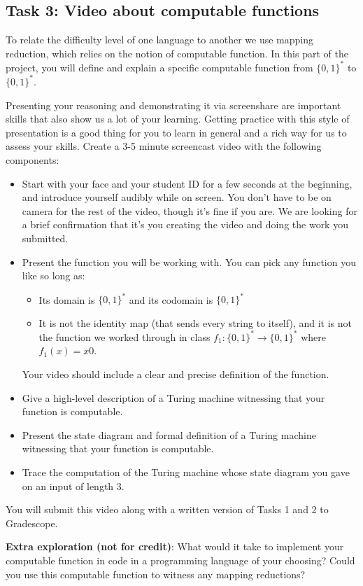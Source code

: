 \documentclass[12pt, oneside]{article}
\begin{document}
		
\subsection*{Task 3: Video about computable functions}
To relate the difficulty level of one language to another we use mapping reduction, which relies
on the notion of computable function. In this part of the project, you will define and explain a specific 
computable function from $\{0,1\}^*$ to $\{0,1\}^*$.

 Presenting your reasoning and demonstrating it via screenshare are important skills that 
 also show us a lot of your learning. Getting practice with this style of presentation is a 
 good thing for you to learn in general and a rich way for us to assess your skills. Create 
 a 3-5 minute screencast video with the following components:
 \begin{itemize}
	\item Start with your face and your student ID for a few seconds at the beginning, and introduce yourself audibly while on screen. 
	You don't have to be on camera for the rest of the video, though it's fine if you are. 
	We are looking for a brief confirmation that it's you creating the video and 
	doing the work you submitted.
	\item Present the function you will be working with. You can pick any function you like so long as:
	\begin{itemize}
		\item Its domain is $\{0,1\}^*$ and its codomain is $\{0,1\}^*$
		\item It is not the identity map (that sends every string to itself), and it is not the function we 
		worked through in class $f_1: \{0,1\}^* \to \{0,1\}^*$ where $f_1(x) = x0$.
	\end{itemize}
	Your video should include a clear and precise definition of the function.
	\item Give a high-level description of a Turing machine witnessing that your function is computable.
	\item Present the state diagram and formal definition of a Turing machine witnessing that your function is computable.
	\item Trace the computation of the Turing machine whose state diagram you gave on an input of length $3$.
\end{itemize}
You will submit this video along with a written version of Tasks 1 and 2 to Gradescope.

{\bf Extra exploration (not for credit)}: What would it take to implement your computable function in code in a programming language
of your choosing? Could you use this computable function to witness any mapping reductions?
\end{document}
